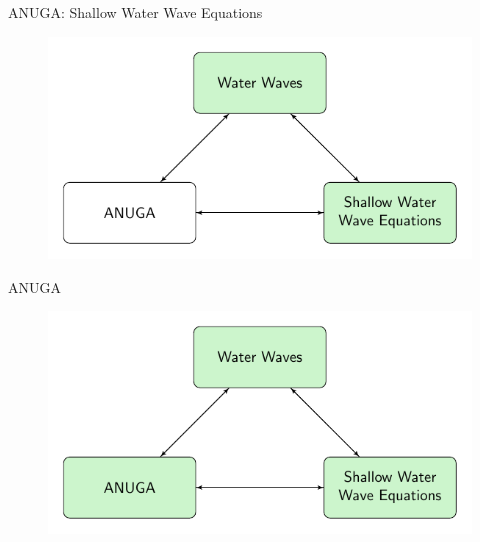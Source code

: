 \documentclass[handout]{beamer}
\begin{document}
\begin{frame}{ANUGA: Shallow Water Wave Equations}
	\begin{figure}
		\includegraphics[width=\textwidth]{./Pics/ModelDiagrams/FlowChartANUGA12G.pdf}
	\end{figure}
\end{frame}

\begin{frame}{ANUGA}
	\begin{figure}
		\includegraphics[width=\textwidth]{./Pics/ModelDiagrams/FlowChartANUGA123G.pdf}
	\end{figure}
\end{frame}
\end{document}
